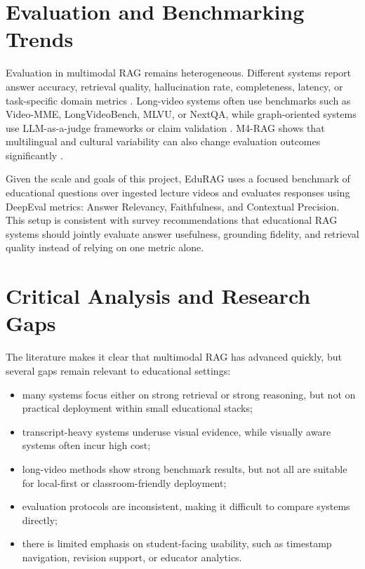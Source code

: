\documentclass[12pt,a4paper,oneside]{report}
\begin{document}
\section{Evaluation and Benchmarking Trends}
Evaluation in multimodal RAG remains heterogeneous. Different systems report answer accuracy, retrieval quality, hallucination rate, completeness, latency, or task-specific domain metrics \cite{brown2024systematic,mei2024survey}. Long-video systems often use benchmarks such as Video-MME, LongVideoBench, MLVU, or NextQA, while graph-oriented systems use LLM-as-a-judge frameworks or claim validation \cite{mao2024multi,xu2024evrag,shen2024vgent,edge2024local}. M4-RAG shows that multilingual and cultural variability can also change evaluation outcomes significantly \cite{anugraha2024m4}.

Given the scale and goals of this project, EduRAG uses a focused benchmark of educational questions over ingested lecture videos and evaluates responses using DeepEval metrics: Answer Relevancy, Faithfulness, and Contextual Precision. This setup is consistent with survey recommendations that educational RAG systems should jointly evaluate answer usefulness, grounding fidelity, and retrieval quality instead of relying on one metric alone.

\section{Critical Analysis and Research Gaps}
The literature makes it clear that multimodal RAG has advanced quickly, but several gaps remain relevant to educational settings:
\begin{itemize}
    \item many systems focus either on strong retrieval or strong reasoning, but not on practical deployment within small educational stacks;
    \item transcript-heavy systems underuse visual evidence, while visually aware systems often incur high cost;
    \item long-video methods show strong benchmark results, but not all are suitable for local-first or classroom-friendly deployment;
    \item evaluation protocols are inconsistent, making it difficult to compare systems directly;
    \item there is limited emphasis on student-facing usability, such as timestamp navigation, revision support, or educator analytics.
\end{itemize}
\end{document}
